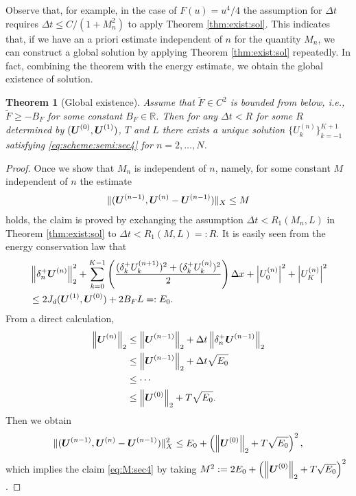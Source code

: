 \documentclass[dvipdfmx-if-dvi,autodetect-engine,ja=standard]{amsart}
\numberwithin{equation}{section} %
\def\vect#1{\mbox{\boldmath $#1$}} %
\newtheorem{theorem}[definition]{Theorem}
\begin{document}
Observe that,
for example,
in the case of
$F(u)=u^4/4$
the assumption for
$\Delta t$ requires
$\Delta t \leq C/(1+ M_n^2)$
to apply Theorem \ref{thm:exist:sol}.
This indicates that, if we have
an a priori estimate
independent of $n$ for the quantity
$M_n$,
we can construct a global solution
by applying Theorem \ref{thm:exist:sol}
repeatedly.
In fact, combining the theorem with the energy estimate, we obtain the global existence of solution. 
\begin{theorem}[Global existence]\label{thm:exist:gl-sol}
Assume that $\tilde{F} \in C^2$ is bounded from below, i.e., $\tilde{F} \geq -B_F$ for some constant $B_F \in \mathbb{R}$. 
Then for any $\Delta t < R$ for some $R$ determined by $(\vect{U}^{(0)}, \vect{U}^{(1)})$, $T$ and $L$ 
there exists a unique solution 
$\{U_k^{(n)}\}_{k=-1}^{K+1}$ satisfying \eqref{eq:scheme:semi:sec4} for
$n = 2,\ldots, N$. 
\end{theorem}
\begin{proof}
Once we show that $M_n$ is independent of $n$, namely,
for some constant $M$ independent of $n$ the estimate
\begin{align}\label{eq:M:sec4}
    \| (\vect{U}^{(n-1)}, \vect{U}^{(n)}-\vect{U}^{(n-1)}) \|_X
    \leq M
\end{align}
holds,
the claim is proved by exchanging the assumption $\Delta t < R_1(M_n,L)$ in Theorem \ref{thm:exist:sol} to $\Delta t < R_1(M,L)=:R$. 
It is easily seen from the energy conservation law that 
\begin{align}
 &\left\| \delta_n^+ \vect{U}^{(n)} \right\|_2^2 
+ \sum_{k=0}^{K-1} 
    \left(
        \frac{(\delta_k^+ U_k^{(n+1)})^2 + (\delta_k^+ U_k^{(n)})^2}{2}
    \right)
    \Delta x
+ \left| U_0^{(n)} \right|^2 + \left| U_K^{(n)} \right|^2 \\
&\leq 2 J_d(\vect{U}^{(1)}, \vect{U}^{(0)}) + 2B_F L =:E_0. 
\end{align}
From a direct calculation,
\begin{align*}
    \left\| \vect{U}^{(n)} \right\|_2 
    &\leq  \left\| \vect{U}^{(n-1)} \right\|_2 + \Delta t \left\| \delta_n^+ \vect{U}^{(n-1)} \right\|_2 \\
    &\leq  \left\| \vect{U}^{(n-1)} \right\|_2 + \Delta t \sqrt{E_0} \\
    &\leq \cdots \\
    &\leq \left\| \vect{U}^{(0)} \right\|_2 + T \sqrt{E_0}. 
\end{align*}
Then we obtain 
\[
    \| (\vect{U}^{(n-1)}, \vect{U}^{(n)}-\vect{U}^{(n-1)}) \|_X^2
    \leq
    E_0 + \left( \left\| \vect{U}^{(0)} \right\|_2 + T \sqrt{E_0} \right)^2, 
\]
which implies the claim
\eqref{eq:M:sec4}
by taking
$M^2 := 2 E_0 + \left( \left\| \vect{U}^{(0)} \right\|_2 + T \sqrt{E_0} \right)^2$. 
\end{proof}
\end{document}
